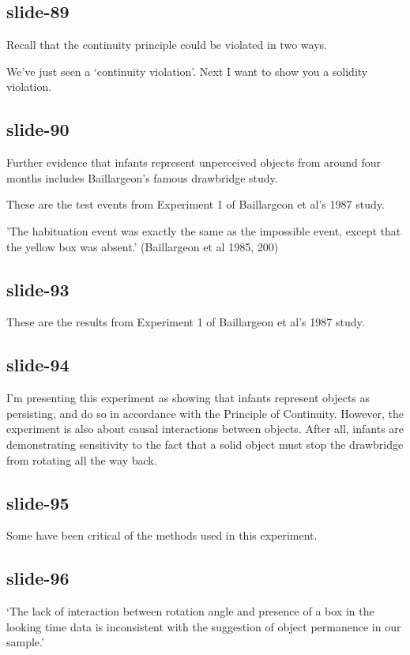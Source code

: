 \documentclass[12pt,\papersize]{extarticle}
\begin{document}
\subsection{slide-89}
Recall that the continuity principle could be violated in two ways.
 
We've just seen a `continuity violation'.  Next I want to show you a solidity violation.
 
\subsection{slide-90}
Further evidence that infants represent unperceived objects from around four months 
includes Baillargeon's famous drawbridge study.
 
These are the test events from Experiment 1 of Baillargeon et al's 1987 study.
 
'The habituation event was exactly the same as the impossible event, except that the yellow box was absent.' (Baillargeon et al 1985, 200)
 
\subsection{slide-93}
These are the results from Experiment 1 of Baillargeon et al's 1987 study.
 
\subsection{slide-94}
I'm presenting this experiment as showing that infants represent objects as persisting, and do so
in accordance with the Principle of Continuity.  However, the experiment is also about 
causal interactions between objects.  After all, infants are demonstrating sensitivity to
the fact that a solid object must stop the drawbridge from rotating all the way back.
 
\subsection{slide-95}
Some have been critical of the methods used in this experiment.
 
\subsection{slide-96}
‘The lack of interaction between rotation angle and presence of a box in
the looking time data is inconsistent with the suggestion of object
permanence in our sample.’ 
\citep[p.~73]{sirois:2012_pupil}
 
\end{document}

